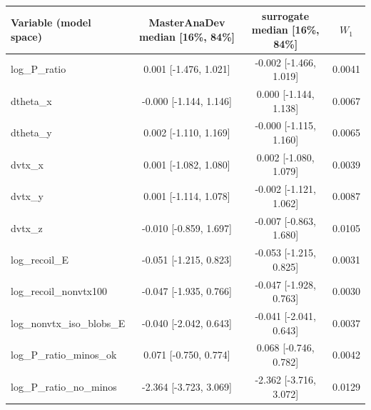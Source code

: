 \begin{tabular}{lccc}
\toprule
Variable (model space) & MasterAnaDev median [16\%, 84\%] & surrogate median [16\%, 84\%] & $W_1$ \\
\midrule
log\_P\_ratio & 0.001 [-1.476, 1.021] & -0.002 [-1.466, 1.019] & 0.0041 \\
dtheta\_x & -0.000 [-1.144, 1.146] & 0.000 [-1.144, 1.138] & 0.0067 \\
dtheta\_y & 0.002 [-1.110, 1.169] & -0.000 [-1.115, 1.160] & 0.0065 \\
dvtx\_x & 0.001 [-1.082, 1.080] & 0.002 [-1.080, 1.079] & 0.0039 \\
dvtx\_y & 0.001 [-1.114, 1.078] & -0.002 [-1.121, 1.062] & 0.0087 \\
dvtx\_z & -0.010 [-0.859, 1.697] & -0.007 [-0.863, 1.680] & 0.0105 \\
log\_recoil\_E & -0.051 [-1.215, 0.823] & -0.053 [-1.215, 0.825] & 0.0031 \\
log\_recoil\_nonvtx100 & -0.047 [-1.935, 0.766] & -0.047 [-1.928, 0.763] & 0.0030 \\
log\_nonvtx\_iso\_blobs\_E & -0.040 [-2.042, 0.643] & -0.041 [-2.041, 0.643] & 0.0037 \\
log\_P\_ratio\_minos\_ok & 0.071 [-0.750, 0.774] & 0.068 [-0.746, 0.782] & 0.0042 \\
log\_P\_ratio\_no\_minos & -2.364 [-3.723, 3.069] & -2.362 [-3.716, 3.072] & 0.0129 \\
\bottomrule
\end{tabular}
